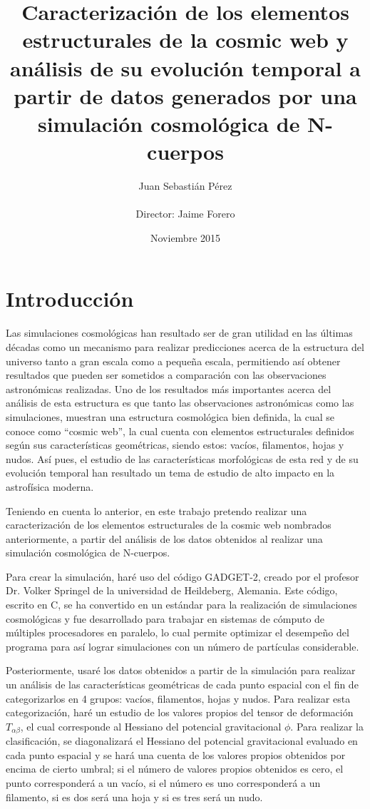 \documentclass{article}
\title{Caracterización de los elementos estructurales de la cosmic web y análisis de su evolución temporal a partir de datos generados por una simulación cosmológica de N-cuerpos}
\author{Juan Sebastián Pérez\\ \\Director: Jaime Forero}
\date{Noviembre 2015}
\begin{document}
\maketitle

\section{Introducción}

Las simulaciones cosmológicas han resultado ser de gran utilidad en las últimas décadas como un mecanismo para realizar predicciones acerca de la estructura del universo tanto a gran escala como a pequeña escala, permitiendo así obtener resultados que pueden ser sometidos a comparación con las observaciones astronómicas realizadas. Uno de los resultados más importantes acerca del análisis de esta estructura es que tanto las observaciones astronómicas como las simulaciones, muestran una estructura cosmológica bien definida, la cual se conoce como “cosmic web”, la cual cuenta con elementos estructurales definidos según sus características geométricas, siendo estos: vacíos, filamentos, hojas y nudos. Así pues, el estudio de las características morfológicas de esta red y de su evolución temporal han resultado un tema de estudio de alto impacto en la astrofísica moderna.

Teniendo en cuenta lo anterior, en este trabajo pretendo realizar una caracterización de los elementos estructurales de la cosmic web nombrados anteriormente, a partir del análisis de los datos obtenidos al realizar una simulación cosmológica de N-cuerpos. 

Para crear la simulación, haré uso del código GADGET-2\cite{Gadget}, creado por el profesor Dr. Volker Springel de la universidad de Heildeberg, Alemania. Este código, escrito en C, se ha convertido en un estándar para la realización de simulaciones cosmológicas y fue desarrollado para trabajar en sistemas de cómputo de múltiples procesadores en paralelo, lo cual permite optimizar el desempeño del programa para así lograr simulaciones con un número de partículas considerable.

Posteriormente, usaré los datos obtenidos a partir de la simulación para realizar un análisis de las características geométricas de cada punto espacial con el fin de categorizarlos en 4 grupos: vacíos, filamentos, hojas y nudos. Para realizar esta categorización, haré un estudio de los valores propios del tensor de deformación $T_{\alpha\beta}$, el cual corresponde al Hessiano del potencial gravitacional $\phi$\cite{Forero-Romero}\cite{tv-web}. Para realizar la clasificación, se diagonalizará el Hessiano del potencial gravitacional evaluado en cada punto espacial y se hará una cuenta de los valores propios obtenidos por encima de cierto umbral; si el número de valores propios obtenidos es cero, el punto corresponderá a un vacío, si el número es uno corresponderá a un filamento, si es dos será una hoja y si es tres será un nudo.    
\end{document}
